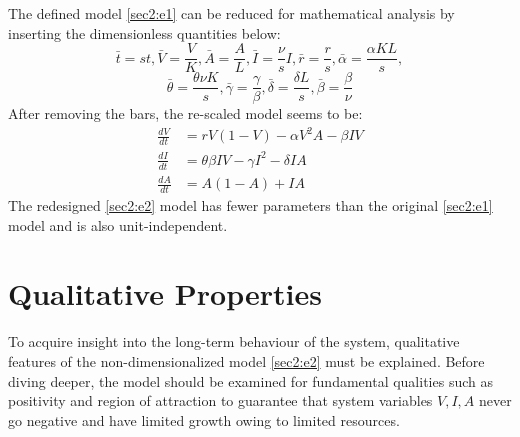 \documentclass[12pt]{article}
\numberwithin{equation}{section}
\begin{document}
The defined model \eqref{sec2:e1} can be reduced for mathematical analysis by inserting the dimensionless quantities below:\\
\begin{equation*}
\bar t=st, \bar V=\frac{V}{K}, \bar A=\frac{A}{L}, \bar I=\frac{\nu}{s}I, \bar r=\frac{r}{s}, \bar \alpha=\frac{\alpha KL}{s},
\end{equation*}
\begin{equation*}
 \bar \theta=\frac{\theta \nu K}{s}, \bar \gamma =\frac{\gamma}{\beta}, \bar \delta=\frac{\delta L}{s}, \bar \beta=\frac{\beta}{\nu}
\end{equation*}
After removing the bars, the re-scaled model seems to be:
 \begin{subequations}\label{sec2:e2}
	\begin{align}
	\label{sec2:e2a} \frac{dV}{dt}&=rV(1-V)-\alpha V^2A - \beta IV\\
	\label{sec2:e2b} \frac{dI}{dt}&=\theta \beta IV - \gamma I^2 - \delta IA\\
	\label{sec2:e2c} \frac{dA}{dt}&=A(1-A)+IA
	\end{align}
\end{subequations}
The redesigned \eqref{sec2:e2} model has fewer parameters than the original \eqref{sec2:e1} model and is also unit-independent.
\section{Qualitative Properties}
To acquire insight into the long-term behaviour of the system, qualitative features of the non-dimensionalized model \eqref{sec2:e2} must be explained. Before diving deeper, the model should be examined for fundamental qualities such as positivity and region of attraction to guarantee that system variables $V,I,A$ never go negative and have limited growth owing to limited resources.
\end{document}
